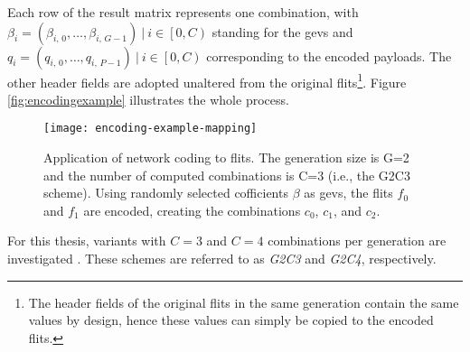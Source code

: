 Each row of the result matrix represents one combination, with $\beta_i = (\beta_{i,\,0}, …, \beta_{i,\,G-1})\ |\ i \in \left[0, C\right)$ standing
for the \glspl{gev} and $q_i = (q_{i,\,0}, …, q_{i,\,P-1})\ |\ i \in \left[0, C\right)$ corresponding to the encoded payloads. The other header fields
are adopted unaltered from the original flits\footnote{The header fields of the original flits in the same generation contain the same values by
design, hence these values can simply be copied to the encoded flits.}. Figure \vref{fig:encodingexample} illustrates the whole process.

\begin{figure}
    \centering
    \texttt{[image: encoding-example-mapping]}
    \caption[Application of network coding to flits]{Application of network coding to flits. The generation size is G=2 and the number of computed
    combinations is C=3 (i.e., the G2C3 scheme). Using randomly selected cofficients $\beta$ as \glspl{gev}, the flits $f_0$ and $f_1$ are encoded,
    creating the combinations $c_0$, $c_1$, and $c_2$.}
    \label{fig:encodingexample}
\end{figure}

For this thesis, variants with $C = 3$ and $C = 4$ combinations per generation are investigated \cite[cf.][2]{moriam18activeattackers}. These schemes
are referred to as \textit{G2C3} and \textit{G2C4}, respectively.

